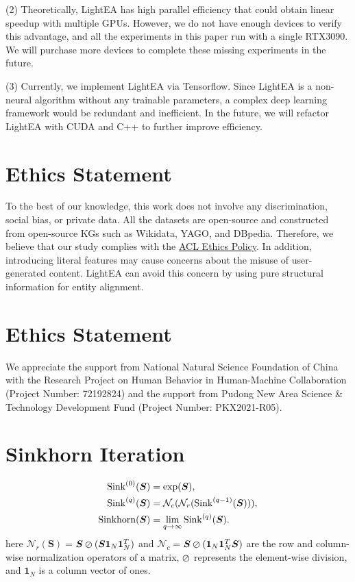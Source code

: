 \documentclass[11pt]{article}
\begin{document}
(2) Theoretically, LightEA has high parallel efficiency that could obtain linear speedup with multiple GPUs.
However, we do not have enough devices to verify this advantage, and all the experiments in this paper run with a single RTX3090.
We will purchase more devices to complete these missing experiments in the future.

(3) Currently, we implement LightEA via Tensorflow.
Since LightEA is a non-neural algorithm without any trainable parameters, a complex deep learning framework would be redundant and inefficient.
In the future, we will refactor LightEA with CUDA and C++ to further improve efficiency.


\section*{Ethics Statement}
To the best of our knowledge, this work does not involve any discrimination, social bias, or private data.
All the datasets are open-source and constructed from open-source KGs such as Wikidata, YAGO, and DBpedia.
Therefore, we believe that our study complies with the \href{https://www.aclweb.org/portal/content/acl-code-ethics}{ACL Ethics Policy}.
In addition, introducing literal features may cause concerns about the misuse of user-generated content.
LightEA can avoid this concern by using pure structural information for entity alignment.

\section*{Ethics Statement}
We appreciate the support from National Natural Science Foundation of China with the Research Project on Human Behavior in Human-Machine Collaboration (Project Number: 72192824) and the support from Pudong New Area Science \& Technology Development Fund (Project Number: PKX2021-R05).





\clearpage
\appendix

\section{Sinkhorn Iteration}
\label{apd:sinkhorn}
\begin{align}
\begin{split}
    {\rm Sink}^{(0)}(\bm S) &= \exp(\bm S),\\
    {\rm Sink}^{(q)}(\bm S) &= {\mathcal N}_c({\mathcal N}_r({\rm Sink}^{(q-1)}(\bm S))),\\
    {\rm Sinkhorn}(\bm S) &= \lim_{q\rightarrow\infty}{\rm Sink}^{(q)}(\bm S).
\end{split}
\end{align}
here {\small${\mathcal N}_r(\bm S)$$=$$ \bm S \varoslash (\bm S \bm 1_{N}\bm 1_{N}^T)$} and {\small ${\mathcal N}_c $$=$$ \bm S \varoslash (\bm 1_{N}\bm 1_{N}^T\bm S)$} are the row and column-wise normalization operators of a matrix, $\varoslash$ represents the element-wise division, and $\bm 1_{N}$ is a column vector of ones.
\end{document}
